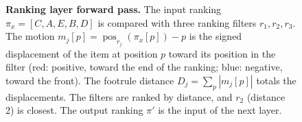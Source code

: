 \begin{figure}[!htbp]
{%
}
\caption{\textbf{Ranking layer forward pass.} The input ranking $\pi_x = [C, A, E, B, D]$ is compared with three ranking filters $r_1, r_2, r_3$. The motion $m_j[p] = \operatorname{pos}_{r_j}(\pi_x[p]) - p$ is the signed displacement of the item at position $p$ toward its position in the filter (red: positive, toward the end of the ranking; blue: negative, toward the front). The footrule distance $D_j = \sum_p |m_j[p]|$ totals the displacements. The filters are ranked by distance, and $r_2$ (distance 2) is closest. The output ranking $\pi'$ is the input of the next layer.}
\label{fig:forward-pass}
\end{figure}
